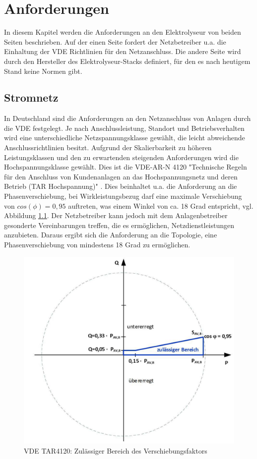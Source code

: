 \chapter{Anforderungen}
\label{chap:Anforderungen}
In diesem Kapitel werden die Anforderungen an den Elektrolyseur von beiden Seiten beschrieben. Auf der einen Seite fordert der Netzbetreiber u.a. die Einhaltung der \gls{VDE} Richtlinien für den Netzanschluss. Die andere Seite wird durch den Hersteller des Elektrolyseur-Stacks definiert, für den es nach heutigem Stand keine Normen gibt.
\section {Stromnetz} \label{sec:AnfStromnetz}
In Deutschland sind die Anforderungen an den Netzanschluss von Anlagen durch die \gls{VDE} festgelegt. Je nach Anschlussleistung, Standort und Betriebsverhalten wird eine unterschiedliche Netzspannungsklasse gewählt, die leicht abweichende Anschlussrichtlinien besitzt. Aufgrund der Skalierbarkeit zu höheren Leistungsklassen und den zu erwartenden steigenden Anforderungen wird die Hochspannungsklasse gewählt. Dies ist die VDE-AR-N 4120 "Technische Regeln für den Anschluss von Kundenanlagen an das Hochspannungsnetz und deren Betrieb (TAR Hochspannung)" \cite{VDEARN4120}.
Dies beinhaltet u.a. die Anforderung an die Phasenverschiebung, bei Wirkleistungsbezug darf eine maximale Verschiebung von $cos(\phi)=0,95$ auftreten, was einem Winkel von ca. 18 Grad entspricht, vgl. Abbildung \ref{fig:tar4120pq}. Der Netzbetreiber kann jedoch mit dem Anlagenbetreiber gesonderte Vereinbarungen treffen, die es ermöglichen, Netzdienstleistungen anzubieten. Daraus ergibt sich die Anforderung an die Topologie, eine Phasenverschiebung von mindestens 18 Grad zu ermöglichen.\\
\begin{figure}[H]
	\centering
	\includegraphics[width=0.6\linewidth]{content/Grafiken/TAR4120_PQ}
	\caption[Zulässiger Bereich des Verschiebungsfaktors cos $\phi$ bei Wirkleistungsbezug]{VDE TAR4120: Zulässiger Bereich des Verschiebungsfaktors \cite{VDEARN4120}}
	\label{fig:tar4120pq}
\end{figure}
